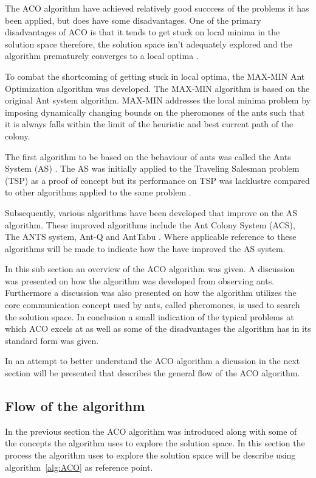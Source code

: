 The ACO algorithm have achieved relatively good succcess of the problems it has been applied, but does have some disadvantages\cite{ImpACOComplex,ACOSurvey}. One of the primary disadvantages of ACO is that it tends to get stuck on local minima in the solution space therefore, the solution space isn't adequately explored and the algorithm prematurely converges to a local optima \cite{ImpACOComplex}.

To combat the shortcoming of getting stuck in local optima, the MAX-MIN Ant Optimization algorithm was developed. The MAX-MIN algorithm is based on the original Ant system algorithm. MAX-MIN addresses the local minima problem by imposing dynamically changing bounds on the pheromones of the ants such that it is always falls within the limit of the heuristic and best current path of the colony\cite{GangWangACO}.

The first algorithm to be based on the behaviour of ants was called the Ants System (AS) \cite{CompuIntelligenceIntro,AntIntroTrends}. The AS was initially applied to the Traveling Salesman problem (TSP) as a proof of concept but its performance on TSP was lacklustre compared to other algorithms applied to the same problem \cite{CompuIntelligenceIntro,AntIntroTrends}. 

Subsequently, various algorithms have been developed that improve on the AS algorithm. These improved algorithms include the Ant Colony System (ACS), The ANTS system, Ant-Q and AntTabu \cite{CompuIntelligenceIntro,AntIntroTrends}. Where applicable reference to these algorithms will be made to indicate how the have improved the AS system.

In this sub section an overview of the ACO algorithm was given. A discussion was presented on how the algorithm was developed from observing ants. Furthermore a discussion was also presented on how the algorithm utilizes the core communication concept used by ants, called pheromones, is used to search the solution space. In conclusion a small indication of the typical problems at which ACO excels at as well as some of the disadvantages the algorithm has in its standard form was given.

In an attempt to better understand the ACO algorithm a dicussion in the next section will be presented that describes the general flow of the ACO algorithm.
\subsection{Flow of the algorithm}
In the previous section the ACO algorithm was introduced along with some of the concepts the algorithm uses to explore the solution space. In this section the process the algorithm uses to explore the solution space will be describe using algorithm~\ref{alg:ACO} as reference point.

